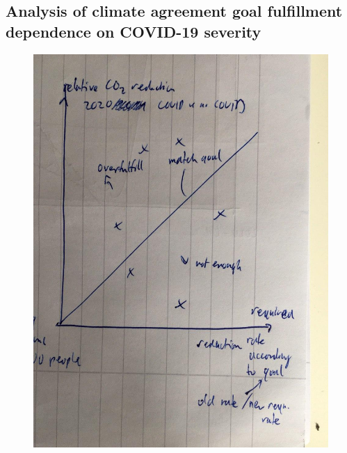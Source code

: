 \subsection{Analysis of climate agreement goal fulfillment dependence on COVID-19 severity}

\begin{figure}
	\centering
	\includegraphics[width=0.7\linewidth]{../DataPipelineResults/reduction_co2_vs_country_goal_rate}
	\caption{}
	\label{fig:reductionco2vscountrygoalrate}
\end{figure}